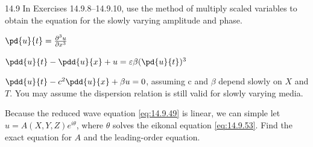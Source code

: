 \begin{exercises}{14.9}
In Exercises 14.9.8--14.9.10, use the method of multiply scaled variables to obtain the equation for the slowly varying amplitude and phase.

\item[\starred] $\pd{u}{t} = \frac{\partial^3 u}{\partial x^3}$

\item $\pdd{u}{t} - \pdd{u}{x} + u = \varepsilon\beta(\pd{u}{t})^3$

\item $\pdd{u}{t} - c^2\pdd{u}{x} + \beta u = 0$, assuming c and $\beta$ depend slowly on $X$ and $T$. You may assume the dispersion relation is still valid for slowly varying media.

\item Because the reduced wave equation \eqref{eq:14.9.49} is linear, we can simple let $u = A(X,Y,Z)e^{i\theta}$, where $\theta$ solves the eikonal equation \eqref{eq:14.9.53}. Find the exact equation for $A$ and the leading-order equation.
\end{exercises}
